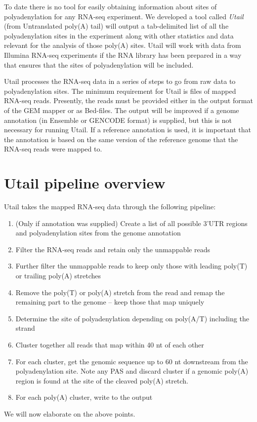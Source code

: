 %
To date there is no tool for easily obtaining information about sites of
polyadenylation for any RNA-seq experiment. We developed a tool called
\textit{Utail} (from Untranslated poly(A) tail) will output a tab-delimited
list of all the polyadenylation sites in the experiment along with other
statistics and data relevant for the analysis of those poly(A) sites. Utail
will work with data from Illumina RNA-seq experiments if the RNA library has
been prepared in a way that ensures that the sites of polyadenylation will be
included.

Utail processes the RNA-seq data in a series of steps to go from raw data to
polyadenylation sites. The minimum requirement for Utail is files of mapped
RNA-seq reads. Presently, the reads must be provided either in the output
format of the GEM mapper \cite{ribeca_gem_2010} or as Bed-files. The output
will be improved if a genome annotation (in Ensemble or GENCODE format) is
supplied, but this is not necessary for running Utail. If a reference
annotation is used, it is important that the annotation is based on the same
version of the reference genome that the RNA-seq reads were mapped to.

\section{Utail pipeline overview}

Utail takes the mapped RNA-seq data through the following pipeline:
\begin{enumerate}
	\item (Only if annotation was supplied) Create a list of all possible
		3'UTR regions and polyadenylation sites from the genome annotation
	\item Filter the RNA-seq reads and retain only the unmappable reads
	\item Further filter the unmappable reads to keep only those with leading
		poly(T) or trailing poly(A) stretches
	\item Remove the poly(T) or poly(A) stretch from the read and remap the
		remaining part to the genome -- keep those that map uniquely
	\item Determine the site of polyadenylation depending on poly(A/T)
		including the strand
	\item Cluster together all reads that map within 40 nt of each other
	\item For each cluster, get the genomic sequence up to 60 nt downstream
		from the polyadenylation site. Note any PAS and discard cluster if a
		genomic poly(A) region is found at the site of the cleaved poly(A)
		stretch.
	\item For each poly(A) cluster, write to the output
\end{enumerate}
We will now elaborate on the above points.\\

